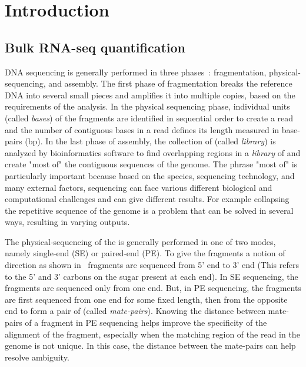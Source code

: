 
\chapter{Introduction} %
\label{intro} %


\section{Bulk RNA-seq quantification}
DNA sequencing is generally performed in three phases~\citep{schadt2010window}: fragmentation, physical-sequencing, and assembly. The first phase of fragmentation breaks the reference DNA into several small pieces and amplifies it into multiple copies, based on the requirements of the analysis. In the physical sequencing phase, individual units (called \textit{bases}) of the fragments are identified in sequential order to create a read and the number of contiguous bases in a read defines its length measured in base-pairs (bp). In the last phase of assembly, the collection of \reads (called \textit{library}) is analyzed by bioinformatics software to find overlapping regions in a \textit{library} of \reads and create "most of" the contiguous sequences of the genome. The phrase "most of" is particularly important because based on the species, sequencing technology, and many external factors, sequencing can face various different biological and computational challenges and can give different results. For example collapsing the repetitive sequence of the genome is a problem that can be solved in several ways, resulting in varying outputs.


\begin{figure*}[!htb]
\centering
\texttt{[image: rapmap/\{Avi.RPE.fig.4]}.pdf}
\caption{From top to bottom: Single-End Sequencing, Paired-End Sequencing, information retained after Paired-End sequencing.}
\label{fig:pe-seq}
\end{figure*}


The physical-sequencing of the \reads is generally performed in one of two modes, namely single-end (SE) or paired-end (PE). To give the fragments a notion of direction as shown in~ fragments are sequenced from 5' end to 3' end (This refers to the 5' and 3' carbons on the sugar present at each end). In SE sequencing, the fragments are sequenced only from one end. But, in PE sequencing, the fragments are first sequenced from one end for some fixed length, then from the opposite end to form a pair of \reads (called \textit{mate-pairs}). Knowing the distance between mate-pairs of a fragment in PE sequencing helps improve the specificity of the alignment of the fragment, especially when the matching region of the read in the genome is not unique. In this case, the distance between the mate-pairs can help resolve ambiguity.


